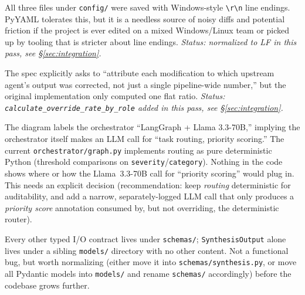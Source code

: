 \documentclass[11pt]{article}
\newenvironment{bugbox}[1]{%
  \begin{tcolorbox}[colback=bugred!5,colframe=bugred!70!black,title=\textbf{#1},fonttitle=\bfseries,boxrule=0.6pt]
}{\end{tcolorbox}}
\begin{document}
\begin{bugbox}{Bug 5 --- CRLF line endings in YAML configs}
All three files under \texttt{config/} were saved with Windows-style \texttt{\textbackslash r\textbackslash n} line endings. PyYAML tolerates this, but it is a needless source of noisy diffs and potential friction if the project is ever edited on a mixed Windows/Linux team or picked up by tooling that is stricter about line endings. \textit{Status: normalized to LF in this pass, see \S\ref{sec:integration}.}
\end{bugbox}

\begin{bugbox}{Bug 6 --- \texttt{eval/override\_rate.py} does not attribute overrides per agent role}
The spec explicitly asks to ``attribute each modification to which upstream agent's output was corrected, not just a single pipeline-wide number,'' but the original implementation only computed one flat ratio. \textit{Status: \texttt{calculate\_override\_rate\_by\_role} added in this pass, see \S\ref{sec:integration}.}
\end{bugbox}

\begin{bugbox}{Bug 7 (design ambiguity, not a code bug) --- Orchestrator's LLM role is undefined}
The diagram labels the orchestrator ``LangGraph + Llama 3.3-70B,'' implying the orchestrator itself makes an LLM call for ``task routing, priority scoring.'' The current \texttt{orchestrator/graph.py} implements routing as pure deterministic Python (threshold comparisons on \texttt{severity}/\texttt{category}). Nothing in the code shows where or how the Llama~3.3-70B call for ``priority scoring'' would plug in. This needs an explicit decision (recommendation: keep \emph{routing} deterministic for auditability, and add a narrow, separately-logged LLM call that only produces a \emph{priority score} annotation consumed by, but not overriding, the deterministic router).
\end{bugbox}

\begin{bugbox}{Bug 8 --- \texttt{models/synthesis.py} lives outside \texttt{schemas/}}
Every other typed I/O contract lives under \texttt{schemas/}; \texttt{SynthesisOutput} alone lives under a sibling \texttt{models/} directory with no other content. Not a functional bug, but worth normalizing (either move it into \texttt{schemas/synthesis.py}, or move all Pydantic models into \texttt{models/} and rename \texttt{schemas/} accordingly) before the codebase grows further.
\end{bugbox}
\end{document}
